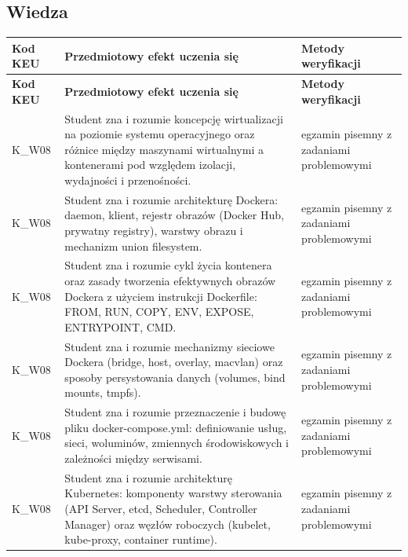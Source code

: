 \documentclass[12pt, a4paper]{article}
\newcommand{\thdrule}{\noalign{\global\setlength{\extrarowheight}{0pt}}}
\newcommand{\thdend}{\noalign{\global\setlength{\extrarowheight}{3pt}}}
\begin{document}
\subsection*{Wiedza}
{\scriptsize
\begin{longtable}{m{1.6cm}m{9.0cm}m{4.2cm}}
\thdrule\toprule
\rowcolor{pjatkRed} {\color{white}\footnotesize\textbf{\vphantom{Ag}Kod KEU}} & {\color{white}\footnotesize\textbf{\vphantom{Ag}Przedmiotowy efekt uczenia się}} & {\color{white}\footnotesize\textbf{\vphantom{Ag}Metody weryfikacji}} \\
\midrule\thdend
\endfirsthead
\thdrule\toprule
\rowcolor{pjatkRed} {\color{white}\footnotesize\textbf{\vphantom{Ag}Kod KEU}} & {\color{white}\footnotesize\textbf{\vphantom{Ag}Przedmiotowy efekt uczenia się}} & {\color{white}\footnotesize\textbf{\vphantom{Ag}Metody weryfikacji}} \\
\midrule\thdend
\endhead
  \rowcolor{tableRowLight} K\_W08 & Student zna i rozumie koncepcję wirtualizacji na poziomie systemu operacyjnego oraz różnice między maszynami wirtualnymi a kontenerami pod względem izolacji, wydajności i przenośności. & egzamin pisemny z zadaniami problemowymi \\
  \rowcolor{tableRowAlt} K\_W08 & Student zna i rozumie architekturę Dockera: daemon, klient, rejestr obrazów (Docker Hub, prywatny registry), warstwy obrazu i mechanizm union filesystem. & egzamin pisemny z zadaniami problemowymi \\
  \rowcolor{tableRowLight} K\_W08 & Student zna i rozumie cykl życia kontenera oraz zasady tworzenia efektywnych obrazów Dockera z użyciem instrukcji Dockerfile: FROM, RUN, COPY, ENV, EXPOSE, ENTRYPOINT, CMD. & egzamin pisemny z zadaniami problemowymi \\
  \rowcolor{tableRowAlt} K\_W08 & Student zna i rozumie mechanizmy sieciowe Dockera (bridge, host, overlay, macvlan) oraz sposoby persystowania danych (volumes, bind mounts, tmpfs). & egzamin pisemny z zadaniami problemowymi \\
  \rowcolor{tableRowLight} K\_W08 & Student zna i rozumie przeznaczenie i budowę pliku docker-compose.yml: definiowanie usług, sieci, woluminów, zmiennych środowiskowych i zależności między serwisami. & egzamin pisemny z zadaniami problemowymi \\
  \rowcolor{tableRowAlt} K\_W08 & Student zna i rozumie architekturę Kubernetes: komponenty warstwy sterowania (API Server, etcd, Scheduler, Controller Manager) oraz węzłów roboczych (kubelet, kube-proxy, container runtime). & egzamin pisemny z zadaniami problemowymi \\

\end{longtable}}
\end{document}
